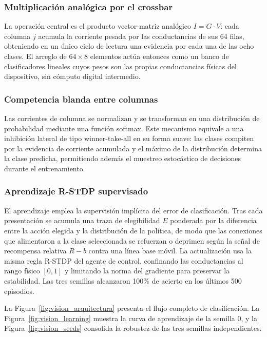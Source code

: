 \subsubsection{Multiplicación analógica por el crossbar}

La operación central es el producto vector-matriz analógico 
$I = G \cdot V$: cada columna $j$ acumula la corriente pesada por 
las conductancias de sus 64 filas, obteniendo en un único ciclo de 
lectura una evidencia por cada una de las ocho clases. El arreglo 
de $64 \times 8$ elementos actúa entonces como un banco de 
clasificadores lineales cuyos pesos son las propias conductancias 
físicas del dispositivo, sin cómputo digital intermedio.

\subsubsection{Competencia blanda entre columnas}

Las corrientes de columna se normalizan y se transforman en una 
distribución de probabilidad mediante una función softmax. Este 
mecanismo equivale a una inhibición lateral de tipo 
winner-take-all en su forma suave: las clases compiten por la 
evidencia de corriente acumulada y el máximo de la distribución 
determina la clase predicha, permitiendo además el muestreo 
estocástico de decisiones durante el entrenamiento.

\subsubsection{Aprendizaje R-STDP supervisado}

El aprendizaje emplea la supervisión implícita del error de 
clasificación. Tras cada presentación se acumula una traza de 
elegibilidad $E$ ponderada por la diferencia entre la acción 
elegida y la distribución de la política, de modo que las 
conexiones que alimentaron a la clase seleccionada se refuerzan 
o deprimen según la señal de recompensa relativa $R - b$ contra 
una línea base móvil. La actualización usa la misma regla R-STDP 
del agente de control, confinando las conductancias al rango 
físico $[0,1]$ y limitando la norma del gradiente para preservar 
la estabilidad. Las tres semillas alcanzaron 100\% de acierto en 
los últimos 500 episodios.

La Figura~\ref{fig:vision_arquitectura} presenta el flujo completo 
de clasificación. La Figura~\ref{fig:vision_learning} muestra la 
curva de aprendizaje de la semilla 0, y la 
Figura~\ref{fig:vision_seeds} consolida la robustez de las tres 
semillas independientes.

